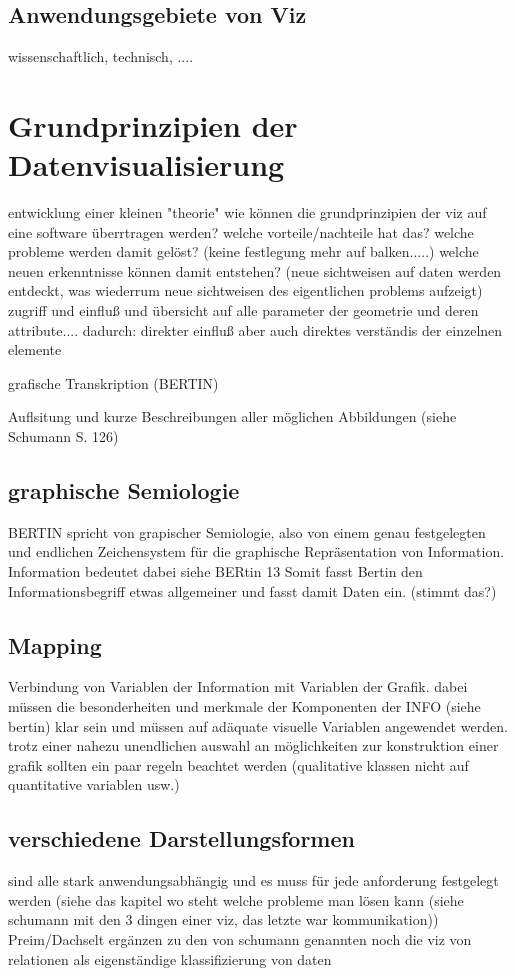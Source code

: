 \documentclass[a4paper, 12pt, onepage, pdftex, headsepline, footsepline]{scrreprt}
\begin{document}
\subsection{Anwendungsgebiete von Viz}
wissenschaftlich, technisch, ....
\section{Grundprinzipien der Datenvisualisierung}
entwicklung einer kleinen "theorie"
wie können die grundprinzipien der viz auf eine software überrtragen werden?
welche vorteile/nachteile hat das?
welche probleme werden damit gelöst? (keine festlegung mehr auf balken.....)
welche neuen erkenntnisse können damit entstehen? (neue sichtweisen auf daten werden entdeckt, was wiederrum neue sichtweisen des eigentlichen problems aufzeigt)
zugriff und einfluß und übersicht auf alle parameter der geometrie und deren attribute....
dadurch: direkter einfluß aber auch direktes verständis der einzelnen elemente

grafische Transkription (BERTIN)

Auflsitung und kurze Beschreibungen aller möglichen Abbildungen (siehe Schumann S. 126)
\subsection{graphische Semiologie}
BERTIN spricht von grapischer Semiologie, also von einem genau festgelegten und endlichen Zeichensystem für die graphische Repräsentation von Information.
Information bedeutet dabei siehe BERtin 13 Somit fasst Bertin den Informationsbegriff etwas allgemeiner und fasst damit Daten ein. (stimmt das?)
\subsection{Mapping}

Verbindung von Variablen der Information mit Variablen der Grafik.
dabei müssen die besonderheiten und merkmale der Komponenten der INFO (siehe bertin) klar sein und müssen auf adäquate visuelle Variablen angewendet werden.
trotz einer nahezu unendlichen auswahl an möglichkeiten zur konstruktion einer grafik sollten ein paar regeln beachtet werden (qualitative klassen nicht auf quantitative variablen usw.)


\subsection{verschiedene Darstellungsformen}
sind alle stark anwendungsabhängig und es muss für jede anforderung festgelegt werden (siehe das kapitel wo steht welche probleme man lösen kann (siehe schumann mit den 3 dingen einer viz, das letzte war kommunikation))
Preim/Dachselt ergänzen zu den von schumann genannten noch die viz von relationen als eigenständige klassifizierung von daten
\end{document}
